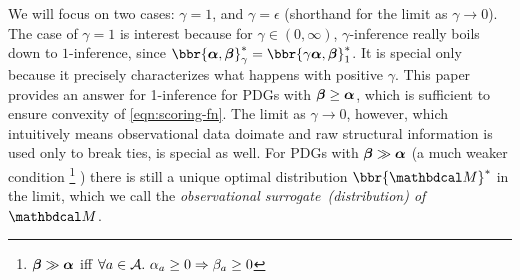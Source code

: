 \documentclass[twoside]{article}
\newcommand\obslimit{observational surrogate} %
\begin{document}
We will focus on two cases: 
 $\gamma = 1$, and
$\gamma = \epsilon$ (shorthand for the limit as $\gamma \to 0$).
The case of $\gamma=1$ is interest because
for $\gamma \in (0, \infty)$, 
$\gamma$-inference really boils down to $1$-inference, since
$\bbr{
\balpha, \bbeta}^*_\gamma
 = 
\bbr{
\gamma \balpha, \bbeta}^*_1$. 
It is special only because it precisely characterizes what happens with positive $\gamma$.
This paper provides an answer for 1-inference
for PDGs
with $\boldsymbol\beta \ge \boldsymbol\alpha$, which is sufficient to ensure convexity of \eqref{eqn:scoring-fn}. 
The limit as $\gamma \to 0$, however, which intuitively means
observational data doimate and
raw structural information is used only to break ties,
is special as well. 
For PDGs with $\boldsymbol\beta \gg \boldsymbol\alpha$ (a much weaker condition%
    \footnote{%
        $\boldsymbol\beta \gg \boldsymbol\alpha$ iff $\forall a \in \mathcal A.~ \alpha_a \ge 0  \Rightarrow \beta_a \ge 0$
    }%
)
there is still a unique optimal distribution $\bbr{\dg M}^*$ in the limit, which we call the \emph{\obslimit\ (distribution) of $\dg M$}. 
%
%
%
%
\end{document}
